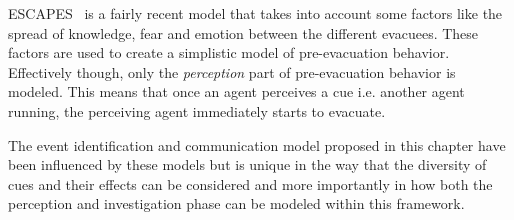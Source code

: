 ESCAPES~\cite{Tsai:2011tz} is a fairly recent model that takes into account some factors like the spread of knowledge, fear and emotion between the different evacuees. These factors are used to create a simplistic model of pre-evacuation behavior. Effectively though, only the \emph{perception} part of pre-evacuation behavior is modeled. This means that  once an agent perceives a cue i.e. another agent running, the perceiving agent immediately starts to evacuate.

The event identification and communication model proposed in this chapter have been influenced by these models but is unique in the way that the diversity of cues and their effects can be considered and more importantly in how both the perception and investigation phase can be modeled within this framework.






